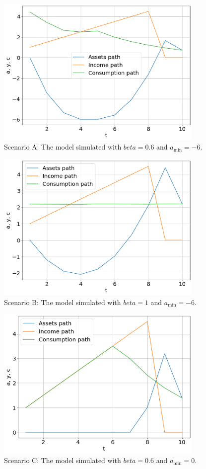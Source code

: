 \documentclass[a4paper, 12pt]{article}
\begin{document}
\begin{figure}[H]
    \centering
    \includegraphics[width = 10cm]{task_1_5a.png}
    \caption{Scenario A: The model simulated with $beta = 0.6$ and $a_{\mathrm{min}} = -6$.}
    \label{fig:graph15a}
\end{figure}

\begin{figure}[H]
    \centering
    \includegraphics[width = 10cm]{task_1_5b.png}
    \caption{Scenario B: The model simulated with $beta = 1$ and $a_{\mathrm{min}} = -6$.}
    \label{fig:graph15b}
\end{figure}

\begin{figure}[H]
    \centering
    \includegraphics[width = 10cm]{task_1_5c.png}
    \caption{Scenario C: The model simulated with $beta = 0.6$ and $a_{\mathrm{min}} = 0$.}
    \label{fig:graph15c}
\end{figure}
\end{document}
